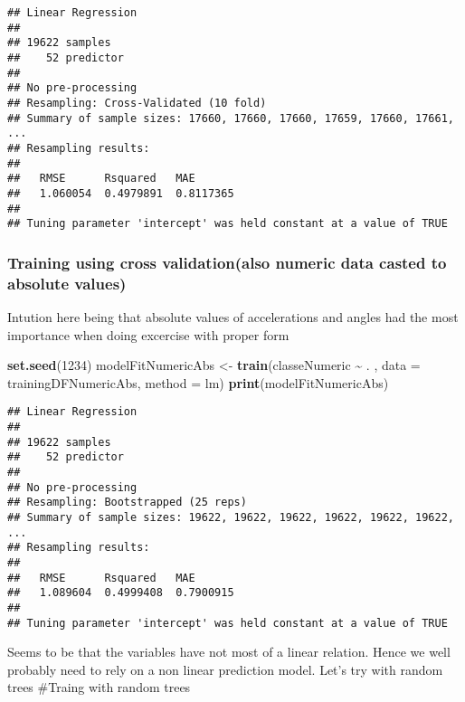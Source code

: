 \documentclass[
]{article}
\newenvironment{Shaded}{\begin{snugshade}}{\end{snugshade}}
\newcommand{\AttributeTok}[1]{\textcolor[rgb]{0.13,0.29,0.53}{#1}}
\newcommand{\DecValTok}[1]{\textcolor[rgb]{0.00,0.00,0.81}{#1}}
\newcommand{\FunctionTok}[1]{\textcolor[rgb]{0.13,0.29,0.53}{\textbf{#1}}}
\newcommand{\NormalTok}[1]{#1}
\newcommand{\OtherTok}[1]{\textcolor[rgb]{0.56,0.35,0.01}{#1}}
\newcommand{\SpecialCharTok}[1]{\textcolor[rgb]{0.81,0.36,0.00}{\textbf{#1}}}
\newcommand{\StringTok}[1]{\textcolor[rgb]{0.31,0.60,0.02}{#1}}
\begin{document}
\begin{verbatim}
## Linear Regression 
## 
## 19622 samples
##    52 predictor
## 
## No pre-processing
## Resampling: Cross-Validated (10 fold) 
## Summary of sample sizes: 17660, 17660, 17660, 17659, 17660, 17661, ... 
## Resampling results:
## 
##   RMSE      Rsquared   MAE      
##   1.060054  0.4979891  0.8117365
## 
## Tuning parameter 'intercept' was held constant at a value of TRUE
\end{verbatim}

\subsubsection{Training using cross validation(also numeric data casted
to absolute
values)}\label{training-using-cross-validationalso-numeric-data-casted-to-absolute-values}

Intution here being that absolute values of accelerations and angles had
the most importance when doing excercise with proper form

\begin{Shaded}
\begin{Highlighting}[]
\FunctionTok{set.seed}\NormalTok{(}\DecValTok{1234}\NormalTok{)}
\NormalTok{modelFitNumericAbs }\OtherTok{\textless{}{-}} \FunctionTok{train}\NormalTok{(classeNumeric }\SpecialCharTok{\textasciitilde{}}\NormalTok{ . , }\AttributeTok{data =}\NormalTok{ trainingDFNumericAbs, }\AttributeTok{method =} \StringTok{\textquotesingle{}lm\textquotesingle{}}\NormalTok{)}
\FunctionTok{print}\NormalTok{(modelFitNumericAbs)}
\end{Highlighting}
\end{Shaded}

\begin{verbatim}
## Linear Regression 
## 
## 19622 samples
##    52 predictor
## 
## No pre-processing
## Resampling: Bootstrapped (25 reps) 
## Summary of sample sizes: 19622, 19622, 19622, 19622, 19622, 19622, ... 
## Resampling results:
## 
##   RMSE      Rsquared   MAE      
##   1.089604  0.4999408  0.7900915
## 
## Tuning parameter 'intercept' was held constant at a value of TRUE
\end{verbatim}

Seems to be that the variables have not most of a linear relation. Hence
we well probably need to rely on a non linear prediction model. Let's
try with random trees \#Traing with random trees
\end{document}
